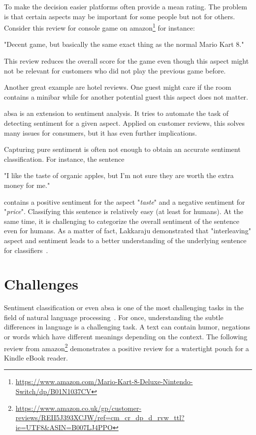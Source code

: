 To make the decision easier platforms often provide a mean rating. The problem is that certain aspects may be important for some people but not for others. Consider this review for console game on amazon\footnote{\url{https://www.amazon.com/Mario-Kart-8-Deluxe-Nintendo-Switch/dp/B01N1037CV}} for instance:

\begin{center}
    "Decent game, but basically the same exact thing as the normal Mario Kart 8."
\end{center}

This review reduces the overall score for the game even though this aspect might not be relevant for customers who did not play the previous game before. 

Another great example are hotel reviews. One guest might care if the room contains a minibar while for another potential guest this aspect does not matter.
\bigskip

\acrfull{absa} is an extension to sentiment analysis. It tries to automate the task of detecting sentiment for a given aspect. Applied on customer reviews, this solves many issues for consumers, but it has even further implications.
\medskip

Capturing pure sentiment is often not enough to obtain an accurate sentiment classification. For instance, the sentence

\begin{center}
    "I like the taste of organic apples, but I'm not sure they are worth the extra money for me."
\end{center}

contains a positive sentiment for the aspect "\textit{taste}" and a negative sentiment for "\textit{price}". Classifying this sentence is relatively easy {(at least for humans)}. At the same time, it is challenging to categorize the overall sentiment of the sentence even for humans. As a matter of fact, Lakkaraju demonstrated that "interleaving" aspect and sentiment leads to a better understanding of the underlying sentence for classifiers~\cite{Lakkaraju2014}.


\section{Challenges}

Sentiment classification or even \acrfull{absa} is one of the most challenging tasks in the field of natural language processing~\cite{Pang2012}. For once, understanding the subtle differences in language is a challenging task. A text can contain humor, negations or words which have different meanings depending on the context. The following review from amazon\footnote{\url{https://www.amazon.co.uk/gp/customer-reviews/REII5J393XCJW/ref=cm_cr_dp_d_rvw_ttl?ie=UTF8&ASIN=B007LJ4PPO}} demonstrates a positive review for a watertight pouch for a Kindle eBook reader.

